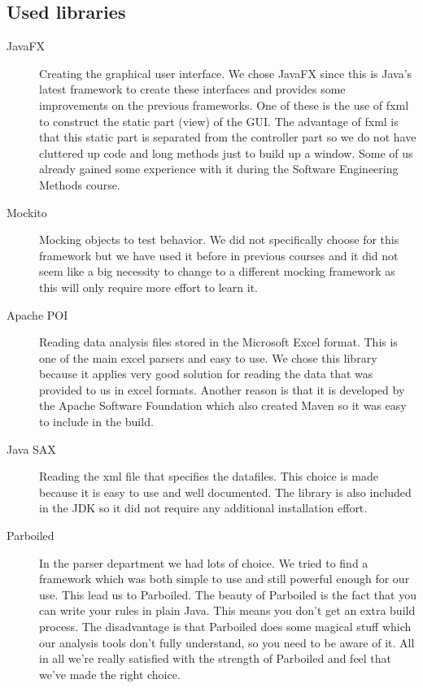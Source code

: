 \documentclass[a4paper]{article}
\begin{document}
\subsection{Used libraries}
\begin{description}

\item[JavaFX] Creating the graphical user interface. We chose JavaFX since this
is Java's latest framework to create these interfaces and provides some
improvements on the previous frameworks. One of these is the use of fxml to
construct the static part (view) of the GUI. The advantage of fxml is that this static part is separated from the controller part so we do not have cluttered up code and long methods just to build up a window. Some of us already gained some
experience with it during the Software Engineering Methods course.

\item[Mockito] Mocking objects to test behavior. We did not specifically choose
for this framework but we have used it before in previous courses and it did not
seem like a big necessity to change to a different mocking framework as this
will only require more effort to learn it.

\item[Apache POI] Reading data analysis files stored in the Microsoft Excel
format. This is one of the main excel parsers and easy to use. We chose this
library because it applies very good solution for reading the data that was
provided to us in excel formats. Another reason is that it is developed by the 
Apache Software Foundation which also created Maven so it was easy to include in
the build.

\item[Java SAX] Reading the xml file that specifies the datafiles. This choice is
made because it is easy to use and well documented. The library is also included
in the JDK so it did not require any additional installation effort.

\item[Parboiled] In the parser department we had lots of choice. We tried to find a
framework which was both simple to use and still powerful enough for our use. This lead
us to Parboiled. The beauty of Parboiled is the fact that you can write your rules in
plain Java. This means you don't get an extra build process. The disadvantage is that
Parboiled does some magical stuff which our analysis tools don't fully understand, 
so you need to be aware of it. All in all we're really satisfied with the strength of
Parboiled and feel that we've made the right choice.

\end{description}
\end{document}
